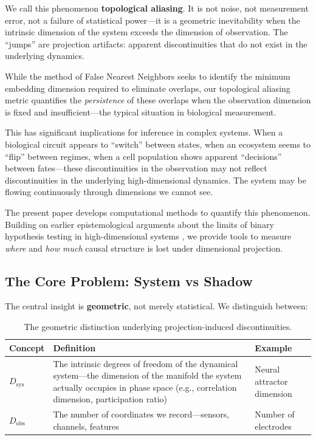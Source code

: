 \documentclass[12pt]{article}
\begin{document}
We call this phenomenon \textbf{topological aliasing}. It is not noise, not measurement error, not a failure of statistical power---it is a geometric inevitability when the intrinsic dimension of the system exceeds the dimension of observation. The ``jumps'' are projection artifacts: apparent discontinuities that do not exist in the underlying dynamics.

While the method of False Nearest Neighbors \cite{kennel1992} seeks to identify the minimum embedding dimension required to eliminate overlaps, our topological aliasing metric quantifies the \emph{persistence} of these overlaps when the observation dimension is fixed and insufficient---the typical situation in biological measurement.

This has significant implications for inference in complex systems. When a biological circuit appears to ``switch'' between states, when an ecosystem seems to ``flip'' between regimes, when a cell population shows apparent ``decisions'' between fates---these discontinuities in the observation may not reflect discontinuities in the underlying high-dimensional dynamics. The system may be flowing continuously through dimensions we cannot see.

The present paper develops computational methods to quantify this phenomenon. Building on earlier epistemological arguments about the limits of binary hypothesis testing in high-dimensional systems \cite{todd2025limits}, we provide tools to measure \emph{where} and \emph{how much} causal structure is lost under dimensional projection.

\subsection{The Core Problem: System vs Shadow}

The central insight is \textbf{geometric}, not merely statistical. We distinguish between:

\begin{table}[h]
\centering
\begin{tabular}{@{}lp{7cm}p{4cm}@{}}
\toprule
\textbf{Concept} & \textbf{Definition} & \textbf{Example} \\
\midrule
$D_{\text{sys}}$ & The intrinsic degrees of freedom of the dynamical system---the dimension of the manifold the system actually occupies in phase space (e.g., correlation dimension, participation ratio) & Neural attractor dimension \\
\addlinespace
$D_{\text{obs}}$ & The number of coordinates we record---sensors, channels, features & Number of electrodes \\
\bottomrule
\end{tabular}
\caption{The geometric distinction underlying projection-induced discontinuities.}
\label{tab:dimensions}
\end{table}
\end{document}
